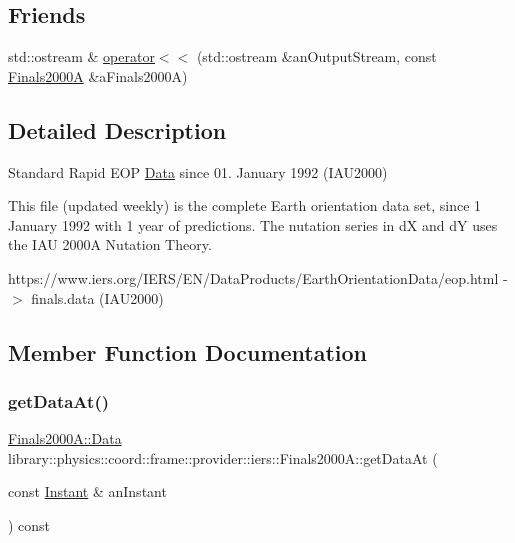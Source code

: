 \subsection*{Friends}
\begin{DoxyCompactItemize}
\item 
std\+::ostream \& \hyperlink{classlibrary_1_1physics_1_1coord_1_1frame_1_1provider_1_1iers_1_1_finals2000_a_ade92763eb1cb719a4a499af1beb72b43}{operator$<$$<$} (std\+::ostream \&an\+Output\+Stream, const \hyperlink{classlibrary_1_1physics_1_1coord_1_1frame_1_1provider_1_1iers_1_1_finals2000_a}{Finals2000A} \&a\+Finals2000A)
\end{DoxyCompactItemize}


\subsection{Detailed Description}
Standard Rapid E\+OP \hyperlink{structlibrary_1_1physics_1_1coord_1_1frame_1_1provider_1_1iers_1_1_finals2000_a_1_1_data}{Data} since 01. January 1992 (I\+A\+U2000) 

This file (updated weekly) is the complete Earth orientation data set, since 1 January 1992 with 1 year of predictions. The nutation series in dX and dY uses the I\+AU 2000A Nutation Theory.

https\+://www.iers.\+org/\+I\+E\+R\+S/\+E\+N/\+Data\+Products/\+Earth\+Orientation\+Data/eop.html -\/$>$ finals.\+data (I\+A\+U2000) 

\subsection{Member Function Documentation}
\mbox{\label{classlibrary_1_1physics_1_1coord_1_1frame_1_1provider_1_1iers_1_1_finals2000_a_a5e7b1a165152fd3ccf0bbfdc859dd3f5}} 
\subsubsection{\texorpdfstring{get\+Data\+At()}{getDataAt()}}
{\footnotesize\ttfamily \hyperlink{structlibrary_1_1physics_1_1coord_1_1frame_1_1provider_1_1iers_1_1_finals2000_a_1_1_data}{Finals2000\+A\+::\+Data} library\+::physics\+::coord\+::frame\+::provider\+::iers\+::\+Finals2000\+A\+::get\+Data\+At (\begin{DoxyParamCaption}\item[{const \hyperlink{classlibrary_1_1physics_1_1time_1_1_instant}{Instant} \&}]{an\+Instant }\end{DoxyParamCaption}) const}

